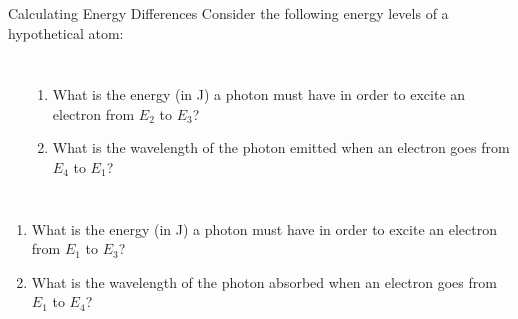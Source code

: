 \documentclass[notes=hide]{beamer}
\begin{document}
\begin{frame}{Calculating Energy Differences}
	Consider the following energy levels of a hypothetical atom:

	\begin{columns}
		\begin{center}
		\end{center}
		\begin{enumerate}
			\item What is the energy (in \si{\joule}) a photon must
				have in order to excite an electron from $E_2$
				to $E_3$?
			\item What is the wavelength of the photon emitted when
				an electron goes from $E_4$ to $E_1$?
		\end{enumerate}
	\end{columns}
\end{frame}

\begin{onyourown}%
	\begin{enumerate}
		\item What is the energy (in \si{\joule}) a photon must
			have in order to excite an electron from $E_1$
			to $E_3$?
		\item What is the wavelength of the photon \alert{absorbed} when
			an electron goes from $E_1$ to $E_4$?
	\end{enumerate}
\end{onyourown}
\end{document}
